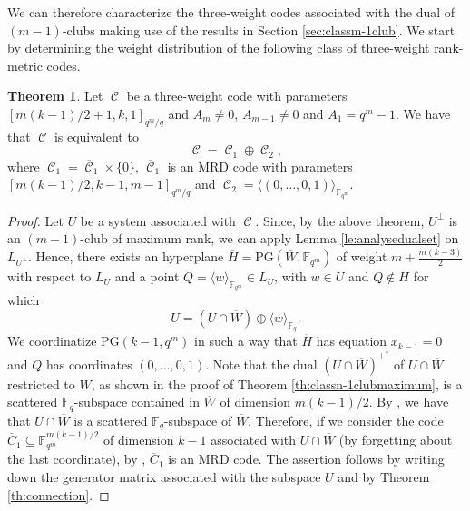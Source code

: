 \documentclass[11pt]{amsart}
\DeclareMathOperator{\C}{\mathcal{C}}
\theoremstyle{definition}
\newtheorem{theorem}{Theorem}[section]
\newcommand{\fq}{{\mathbb F}_{q}}
\newcommand{\la}{\langle}
\newcommand{\ra}{\rangle}
\newcommand{\fqm}{\mathbb{F}_{q^m}}
\begin{document}
We can therefore characterize the three-weight codes associated with the dual of $(m-1)$-clubs making use of the results in Section \ref{sec:classm-1club}.
We start by determining the weight distribution of the following class of three-weight rank-metric codes.

\begin{theorem}
    Let $\C$ be a three-weight code with parameters $[m(k-1)/2+1,k,1]_{q^m/q}$ and $A_m\ne 0$, $A_{m-1}\ne 0$ and $A_1=q^m-1$.
    We have that $\C$ is equivalent to
    \[ \C= \C_1 \oplus \C_2, \]
    where $\C_1=\overline{\C}_1\times\{0\}$, $\overline{\C}_1$ is an MRD code with parameters $[m(k-1)/2,k-1,m-1]_{q^m/q}$ and $\C_2=\la (0,\ldots,0,1)\ra_{\fqm}$.
\end{theorem}
\begin{proof}
    Let $U$ be a system associated with $\C$.
    Since, by the above theorem, $U^\perp$ is an $(m-1)$-club of maximum rank, we can apply Lemma \ref{le:analysedualset} on $L_{U^\perp}$. Hence, there exists an hyperplane \(\overline{H} = \mathrm{PG}(\overline{W}, \mathbb{F}_{q^m})\) of weight \(m + \frac{m(k - 3)}{2}\) with respect to \(L_{U}\) and a point \(Q = \langle w \rangle_{\mathbb{F}_{q^m}} \in L_{U}\), with \(w \in U\) and \(Q \notin \overline{H}\) for which
    \[
    U = (U \cap \overline{W}) \oplus \langle w \rangle_{\mathbb{F}_q}.
    \]
    We coordinatize $\mathrm{PG}(k-1,q^m)$ in such a way that $\overline{H}$ has equation $x_{k-1}=0$ and $Q$ has coordinates $(0,\ldots,0,1)$.
    Note that the dual $(U \cap \overline{W})^{\perp^*}$ of $U \cap \overline{W}$ restricted to $\overline{W}$, as shown in the proof of Theorem \ref{th:classn-1clubmaximum}, is a scattered $\fq$-subspace contained in $\overline{W}$ of dimension $m(k-1)/2$. By \cite[Theorem 3.5]{polverino2010linear}, we have that $U \cap \overline{W}$ is a scattered $\fq$-subspace of $\overline{W}$.
    Therefore, if we consider the code $\overline{C}_1\subseteq \fqm^{m(k-1)/2}$ of dimension $k-1$ associated with $U \cap \overline{W}$ (by forgetting about the last coordinate), by \cite[Section 3]{zini2021scattered}, $\overline{C}_1$ is an MRD code.
    The assertion follows by writing down the generator matrix associated with the subspace $U$ and by Theorem \ref{th:connection}.
\end{proof}
\end{document}
